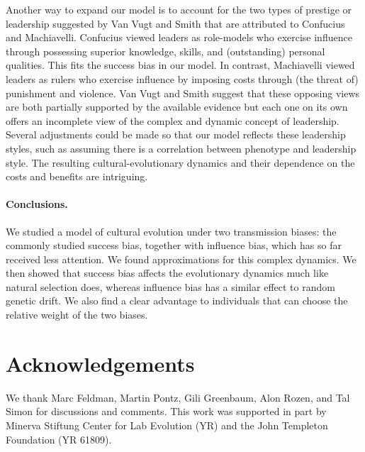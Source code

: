 \documentclass[12pt]{extarticle}
\begin{document}
Another way to expand our model is to account for the two types of prestige or leadership suggested by {Van Vugt and Smith} \citep{dual_leadership} that are attributed to Confucius and Machiavelli. Confucius viewed leaders as role-models who exercise influence through possessing superior knowledge, skills, and (outstanding) personal qualities. This fits the success bias in our model. 
In contrast, Machiavelli viewed leaders as rulers who exercise influence by imposing costs through (the threat of) punishment and violence. 
{Van Vugt and Smith suggest} that these opposing views are both partially supported by the available evidence but each one on its own offers an incomplete view of the complex and dynamic concept of leadership. 
Several adjustments could be made so that our model reflects these leadership styles, such as assuming there is a correlation between phenotype {and} leadership style. 
The {resulting} cultural-evolutionary dynamics and their dependence on the costs and benefits are intriguing.

\paragraph{Conclusions.}
{We} studied a model of cultural evolution under two transmission biases: the commonly studied success bias, together with influence bias, which has so far received less attention. We found approximations for this complex dynamics. We then showed that success bias affects the evolutionary dynamics much like natural selection does, whereas influence bias has a similar effect to random genetic drift. We also find a clear advantage to individuals that can choose the relative weight of the two biases.

{\small
\section*{Acknowledgements}
We thank Marc Feldman, Martin Pontz, Gili Greenbaum, Alon Rozen, and Tal Simon for discussions and comments.
This work was supported in part by 
Minerva Stiftung Center for Lab Evolution (YR) and  the John Templeton Foundation (YR 61809).
}
\end{document}
